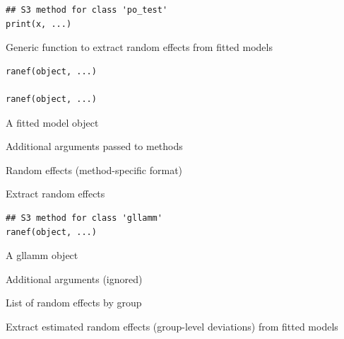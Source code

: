 \documentclass[a4paper]{book}
\begin{document}
%
\begin{Usage}
\begin{verbatim}
## S3 method for class 'po_test'
print(x, ...)
\end{verbatim}
\end{Usage}
%
\begin{Description}
Generic function to extract random effects from fitted models
\end{Description}
%
\begin{Usage}
\begin{verbatim}
ranef(object, ...)

ranef(object, ...)
\end{verbatim}
\end{Usage}
%
\begin{Arguments}
\begin{ldescription}
\item[\code{object}] A fitted model object

\item[\code{...}] Additional arguments passed to methods
\end{ldescription}
\end{Arguments}
%
\begin{Value}
Random effects (method-specific format)
\end{Value}
%
\begin{Description}
Extract random effects
\end{Description}
%
\begin{Usage}
\begin{verbatim}
## S3 method for class 'gllamm'
ranef(object, ...)
\end{verbatim}
\end{Usage}
%
\begin{Arguments}
\begin{ldescription}
\item[\code{object}] A gllamm object

\item[\code{...}] Additional arguments (ignored)
\end{ldescription}
\end{Arguments}
%
\begin{Value}
List of random effects by group
\end{Value}
%
\begin{Description}
Extract estimated random effects (group-level deviations) from fitted models
\end{Description}
\end{document}
